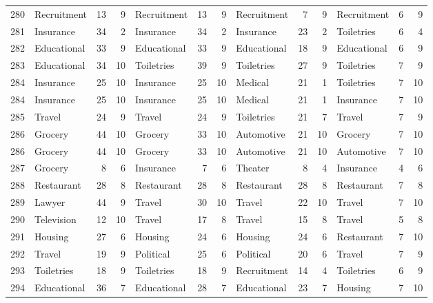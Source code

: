 \begin{figure}[htbp]
\begin{tabular}{rlrrlrrlrrlrr}
    280   & Recruitment & 13    & 9     & Recruitment & 13    & 9     & Recruitment & 7     & 9     & Recruitment & 6     & 9 \\
    281   & Insurance & 34    & 2     & Insurance & 34    & 2     & Insurance & 23    & 2     & Toiletries & 6     & 4 \\
    282   & Educational & 33    & 9     & Educational & 33    & 9     & Educational & 18    & 9     & Educational & 6     & 9 \\
    283   & Educational & 34    & 10    & Toiletries & 39    & 9     & Toiletries & 27    & 9     & Toiletries & 7     & 9 \\
    284   & Insurance & 25    & 10    & Insurance & 25    & 10    & Medical & 21    & 1     & Toiletries & 7     & 10 \\
    284   & Insurance & 25    & 10    & Insurance & 25    & 10    & Medical & 21    & 1     & Insurance & 7     & 10 \\
    285   & Travel & 24    & 9     & Travel & 24    & 9     & Toiletries & 21    & 7     & Travel & 7     & 9 \\
    286   & Grocery & 44    & 10    & Grocery & 33    & 10    & Automotive & 21    & 10    & Grocery & 7     & 10 \\
    286   & Grocery & 44    & 10    & Grocery & 33    & 10    & Automotive & 21    & 10    & Automotive & 7     & 10 \\
    287   & Grocery & 8     & 6     & Insurance & 7     & 6     & Theater & 8     & 4     & Insurance & 4     & 6 \\
    288   & Restaurant & 28    & 8     & Restaurant & 28    & 8     & Restaurant & 28    & 8     & Restaurant & 7     & 8 \\
    289   & Lawyer & 44    & 9     & Travel & 30    & 10    & Travel & 22    & 10    & Travel & 7     & 10 \\
    290   & Television & 12    & 10    & Travel & 17    & 8     & Travel & 15    & 8     & Travel & 5     & 8 \\
    291   & Housing & 27    & 6     & Housing & 24    & 6     & Housing & 24    & 6     & Restaurant & 7     & 10 \\
    292   & Travel & 19    & 9     & Political & 25    & 6     & Political & 20    & 6     & Travel & 7     & 9 \\
    293   & Toiletries & 18    & 9     & Toiletries & 18    & 9     & Recruitment & 14    & 4     & Toiletries & 6     & 9 \\
    294   & Educational & 36    & 7     & Educational & 28    & 7     & Educational & 23    & 7     & Housing & 7     & 10 \\

\end{tabular}
\end{figure}
